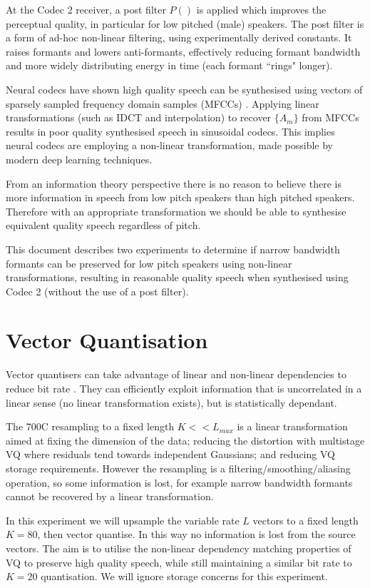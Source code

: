 \documentclass{article}
\begin{document}
At the Codec 2 receiver, a post filter $P()$ is applied which improves the perceptual quality, in particular for low pitched (male) speakers. The post filter is a form of ad-hoc non-linear filtering, using experimentally derived constants.  It raises formants and lowers anti-formants, effectively reducing formant bandwidth and more widely distributing energy in time (each formant ``rings" longer).

Neural codecs have shown high quality speech can be synthesised using vectors of sparsely sampled frequency domain samples (MFCCs) \cite{davis1980comparison}.  Applying linear transformations (such as IDCT and interpolation) to recover $\{A_m\}$ from MFCCs results in poor quality synthesised speech in sinusoidal codecs.  This implies neural codecs are employing a non-linear transformation, made possible by modern deep learning techniques.

From an information theory perspective there is no reason to believe there is more information in speech from low pitch speakers than high pitched speakers. Therefore with an appropriate transformation we should be able to synthesise equivalent quality speech regardless of pitch.

This document describes two experiments to determine if narrow bandwidth formants can be preserved for low pitch speakers using non-linear transformations, resulting in reasonable quality speech when synthesised using Codec 2 (without the use of a post filter).  

\section{Vector Quantisation}
\label{sec:vq}

Vector quantisers can take advantage of linear and non-linear dependencies to reduce bit rate \cite{makhoul1985vector}.  They can efficiently exploit information that is uncorrelated in a linear sense (no linear transformation exists), but is statistically dependant.

The 700C resampling to a fixed length $K<<L_{max}$ is a linear transformation aimed at fixing the dimension of the data; reducing the distortion with multistage VQ where residuals tend towards independent Gaussians; and reducing VQ storage requirements.  However the resampling is a filtering/smoothing/aliasing operation, so some information is lost, for example narrow bandwidth formants cannot be recovered by a linear transformation.

In this experiment we will upsample the variable rate $L$ vectors to a fixed length $K=80$, then vector quantise.  In this way no information is lost from the source vectors.  The aim is to utilise the non-linear dependency matching properties of VQ to preserve high quality speech, while still maintaining a similar bit rate to $K=20$ quantisation.  We will ignore storage concerns for this experiment. 
\end{document}
